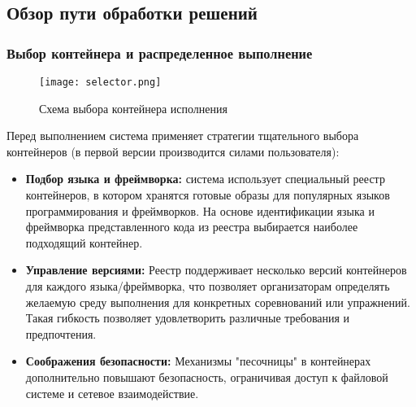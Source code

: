 

\subsection{Обзор пути обработки решений}


\subsubsection{Выбор контейнера и распределенное выполнение}
\begin{figure}[h]
    \centering
    \texttt{[image: selector.png]}
    \caption{Схема выбора контейнера исполнения}
    \noindent
\end{figure}

\noindent

Перед выполнением система применяет стратегии тщательного выбора контейнеров (в первой версии производится силами пользователя):
\begin{itemize}
    \itemsep 0em
    \item \textbf{Подбор языка и фреймворка:} система использует специальный реестр контейнеров, в котором хранятся готовые образы для популярных языков программирования и фреймворков. На основе идентификации языка и фреймворка представленного кода из реестра выбирается наиболее подходящий контейнер.
    \item \textbf{Управление версиями:} Реестр поддерживает несколько версий контейнеров для каждого языка/фреймворка, что позволяет организаторам определять желаемую среду выполнения для конкретных соревнований или упражнений. Такая гибкость позволяет удовлетворить различные требования и предпочтения.
    \item \textbf{Соображения безопасности:} Механизмы "песочницы" в контейнерах дополнительно повышают безопасность, ограничивая доступ к файловой системе и сетевое взаимодействие.
\end{itemize}

